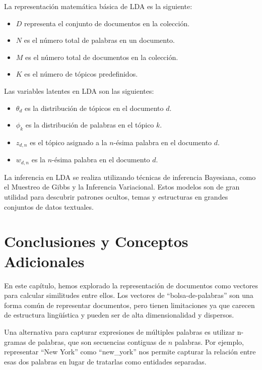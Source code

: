 La representación matemática básica de LDA es la siguiente:


\begin{itemize}
\item \(D\) representa el conjunto de documentos en la colección.
\item \(N\) es el número total de palabras en un documento.
\item \(M\) es el número total de documentos en la colección.
\item \(K\) es el número de tópicos predefinidos.
\end{itemize}

Las variables latentes en LDA son las siguientes:

\begin{itemize}
\item \(\theta_d\) es la distribución de tópicos en el documento \(d\).
\item \(\phi_k\) es la distribución de palabras en el tópico \(k\).
\item \(z_{d,n}\) es el tópico asignado a la \(n\)-ésima palabra en el documento \(d\).
\item \(w_{d,n}\) es la \(n\)-ésima palabra en el documento \(d\).
\end{itemize}

La inferencia en LDA se realiza utilizando técnicas de inferencia Bayesiana, como el Muestreo de Gibbs y la Inferencia Variacional. Estos modelos son de gran utilidad para descubrir patrones ocultos, temas y estructuras en grandes conjuntos de datos textuales.

\section{Conclusiones y Conceptos Adicionales}

En este capítulo, hemos explorado la representación de documentos como vectores para calcular similitudes entre ellos. Los vectores de ``bolsa-de-palabras'' son una forma común de representar documentos, pero tienen limitaciones ya que carecen de estructura lingüística y pueden ser de alta dimensionalidad y dispersos.

Una alternativa para capturar expresiones de múltiples palabras es utilizar n-gramas de palabras, que son secuencias contiguas de $n$ palabras. Por ejemplo, representar ``New York'' como ``new\_york'' nos permite capturar la relación entre esas dos palabras en lugar de tratarlas como entidades separadas.

